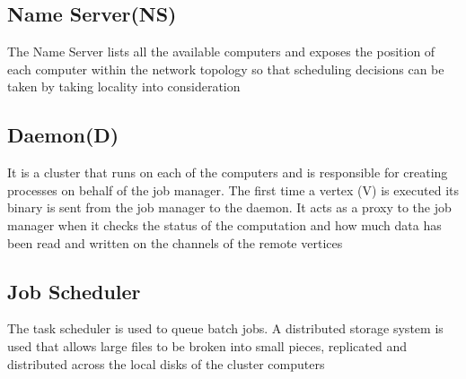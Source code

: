 \documentclass[9pt,twocolumn,twoside]{../../styles/osajnl}
\begin{document}
\subsection{Name Server(NS)} 
The Name Server lists all the available computers and exposes the position of each computer within the network topology so that scheduling decisions can be taken by taking locality into consideration \cite{DryadMSR2}
\subsection{Daemon(D)}
It is a cluster that runs on each of the computers and is responsible for creating processes on behalf of the job manager. The first time a vertex (V) is executed its binary is sent from the job manager to the daemon. It acts as a proxy to the job manager when it checks the status of the computation and how much data has been read and written on the channels of the remote vertices \cite{DryadMSR2}
\subsection{Job Scheduler}
The task scheduler is used to queue batch jobs. A distributed storage system is used that allows large files to be broken into small pieces, replicated and distributed across the local disks of the cluster computers \cite{DryadMSR2}
\end{document}

